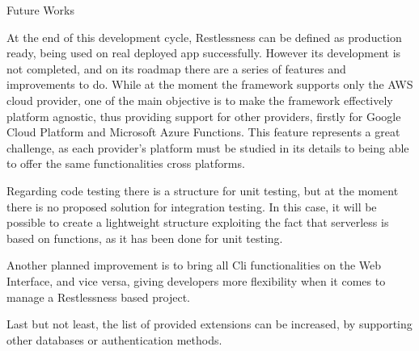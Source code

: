 \begin{chapter}{Future Works}

    At the end of this development cycle, Restlessness can be defined as production
    ready, being used on real deployed app successfully.
    However its development is not completed, and on its roadmap there are a series
    of features and improvements to do. While at the moment the framework supports
    only the AWS cloud provider, one of the main objective is to make the framework
    effectively platform agnostic, thus providing support for other providers, firstly
    for Google Cloud Platform and Microsoft Azure Functions. This feature represents
    a great challenge, as each provider's platform must be studied in its details
    to being able to offer the same functionalities cross platforms.

    Regarding code testing there is a structure for unit testing, but at the moment
    there is no proposed solution for integration testing. In this case, it will be
    possible to create a lightweight structure exploiting the fact that serverless
    is based on functions, as it has been done for unit testing.

    Another planned improvement is to bring all Cli functionalities on the Web
    Interface, and vice versa, giving developers more flexibility when it comes
    to manage a Restlessness based project.

    Last but not least, the list of provided extensions can be increased, by
    supporting other databases or authentication methods.

\end{chapter}